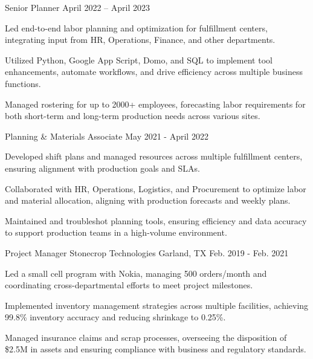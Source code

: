 \begin{cventries}
\cventry
  {Senior Planner} %
  {} %
  {} %
  {April 2022 – April 2023} %
  {
    \begin{cvitems} %
      \item {Led end-to-end labor planning and optimization for fulfillment centers, integrating input from HR, Operations, Finance, and other departments.}
      \item {Utilized Python, Google App Script, Domo, and SQL to implement tool enhancements, automate workflows, and drive efficiency across multiple business functions.}
      \item {Managed rostering for up to 2000+ employees, forecasting labor requirements for both short-term and long-term production needs across various sites.}
    \end{cvitems}
  }

\cventry
  {Planning \& Materials Associate} %
  {} %
  {} %
  {May 2021 - April 2022} %
  {
    \begin{cvitems} %
      \item {Developed shift plans and managed resources across multiple fulfillment centers, ensuring alignment with production goals and SLAs.}
      \item {Collaborated with HR, Operations, Logistics, and Procurement to optimize labor and material allocation, aligning with production forecasts and weekly plans.}
      \item {Maintained and troubleshot planning tools, ensuring efficiency and data accuracy to support production teams in a high-volume environment.}
    \end{cvitems}
  }

\cventry
  {Project Manager} %
  {Stonecrop Technologies} %
  {Garland, TX} %
  {Feb. 2019 - Feb. 2021} %
  {
    \begin{cvitems} %
      \item {Led a small cell program with Nokia, managing 500 orders/month and coordinating cross-departmental efforts to meet project milestones.}
      \item {Implemented inventory management strategies across multiple facilities, achieving 99.8\% inventory accuracy and reducing shrinkage to 0.25\%.}
      \item {Managed insurance claims and scrap processes, overseeing the disposition of \$2.5M in assets and ensuring compliance with business and regulatory standards.}
    \end{cvitems}
  }


\end{cventries}
